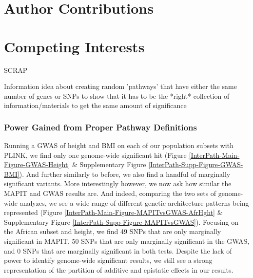 \documentclass[12pt,a4paper]{article}
\begin{document}
\section{Author Contributions}\label{InterPath-Author-Contributions}

\section{Competing Interests}\label{InterPath-Competing-Interests}

\nolinenumbers

\begingroup


\endgroup









\iffalse

SCRAP

Information idea about creating random 'pathways' that have either the same number of genes or SNPs to show that it has to be the *right* collection of information/materials to get the same amount of significance

\subsubsection{Power Gained from Proper Pathway Definitions}

Running a GWAS of height and BMI on each of our population subsets with PLINK, we find only one genome-wide significant hit (Figure \ref{InterPath-Main-Figure-GWAS-Height} \& Supplementary Figure \ref{InterPath-Supp-Figure-GWAS-BMI}). And further similarly to before, we also find a handful of marginally significant variants. More interestingly however, we now ask how similar the MAPIT and GWAS results are. And indeed, comparing the two sets of genome-wide analyzes, we see a wide range of different genetic architecture patterns being represented (Figure \ref{InterPath-Main-Figure-MAPITvsGWAS-AfrHght} \& Supplementary Figure \ref{InterPath-Supp-Figure-MAPITvsGWAS}). Focusing on the African subset and height, we find 49 SNPs that are only marginally significant in MAPIT, 50 SNPs that are only marginally significant in the GWAS, and 0 SNPs that are marginally significant in both tests. Despite the lack of power to identify genome-wide significant results, we still see a strong representation of the partition of additive and epistatic effects in our results. 
\end{document}
